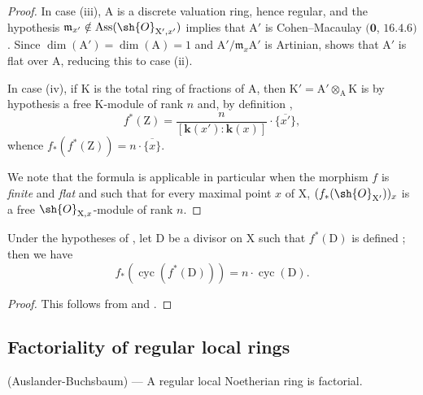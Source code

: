 \begin{proof}
In case (iii), $\mathrm{A}$ is a discrete valuation ring, hence regular, and the hypothesis $\mathfrak{m}_{x'}\notin\operatorname{Ass}(\sh{O}_{\mathrm{X}',x'})$ implies that $\mathrm{A}'$ is Cohen--Macaulay $(\mathbf{0}$, $16.4.6)$.  Since $\dim(\mathrm{A}')=\dim(\mathrm{A})=1$ and $\mathrm{A}'/\mathfrak{m}_x\mathrm{A}'$ is Artinian,  shows that $\mathrm{A}'$ is flat over $\mathrm{A}$, reducing this to case (ii).

In case (iv), if $\mathrm{K}$ is the total ring of fractions of $\mathrm{A}$, then $\mathrm{K}'=\mathrm{A}'\otimes_{\mathrm{A}}\mathrm{K}$ is by hypothesis a free $\mathrm{K}$-module of rank $n$ and, by definition ,
\[
  f^*(\mathrm{Z})=\frac{n}{[\boldsymbol{k}(x'):\boldsymbol{k}(x)]}\cdot\overline{\{x'\}},
\]
whence $f_*(f^*(\mathrm{Z}))=n\cdot\overline{\{x\}}$.

We note that the formula  is applicable in particular when the morphism $f$ is \emph{finite} and \emph{flat} and such that for every maximal point $x$ of $\mathrm{X}$, $(f_*(\sh{O}_{\mathrm{X}'}))_x$ is a free $\sh{O}_{\mathrm{X},x}$-module of rank $n$.
\end{proof}

\begin{corollary}[21.10.19]
\label{IV.21.10.19}
Under the hypotheses of , let $\mathrm{D}$ be a divisor on $\mathrm{X}$ such that $f^*(\mathrm{D})$ is defined ; then we have
\[
\label{IV.21.10.19.1}
  f_*(\operatorname{cyc}(f^*(\mathrm{D})))=n\cdot\operatorname{cyc}(\mathrm{D}).
  \tag{21.10.19.1}
\]
\end{corollary}

\begin{proof}
This follows from  and .
\end{proof}

\subsection{Factoriality of regular local rings}
\label{subsection:IV.21.11}
\label{IV.21.11}

\begin{theorem}[21.11.1]
\label{IV.21.11.1}
\textup{(Auslander-Buchsbaum)} ---
A regular local Noetherian ring is factorial.
\end{theorem}

